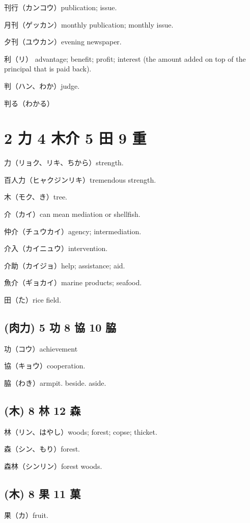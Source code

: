 刊行（カンコウ）publication; issue.

月刊（ゲッカン）monthly publication; monthly issue.

夕刊（ユウカン）evening newspaper.

利（リ）
advantage; benefit; profit;
interest (the amount added on top of the principal that is paid back).

判（ハン、わか）judge.

判る（わかる）

\section{2 力 4 木介 5 田 9 重}

力（リョク、リキ、ちから）strength.

百人力（ヒャクジンリキ）tremendous strength.

木（モク、き）tree.

介（カイ）can mean mediation or shellfish.

仲介（チュウカイ）agency; intermediation.

介入（カイニュウ）intervention.

介助（カイジョ）help; assistance; aid.

魚介（ギョカイ）marine products; seafood.

田（た）rice field.

\subsection{(肉力) 5 功 8 協 10 脇}

功（コウ）achievement

協（キョウ）cooperation.

脇（わき）armpit. beside. aside.

\subsection{(木) 8 林 12 森}

林（リン、はやし）woods; forest; copse; thicket.

森（シン、もり）forest.

森林（シンリン）forest woods.

\subsection{(木) 8 果 11 菓}

果（カ）fruit.

